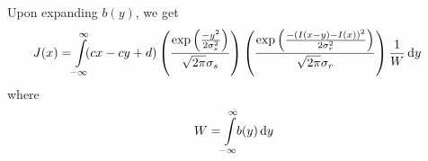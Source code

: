 \documentclass[a4paper]{article}
\begin{document}
\begin{enumerate}
Upon expanding $b(y)$, we get
\begin{align*}
J(x) &= \int\limits_{\mathclap{-\infty}}^{\mathclap{\infty}}\! (cx - cy + d) \left ( \dfrac{\exp\left (\frac{-y^2}{2\sigma_s^2}\right )}{\sqrt{2\pi}\sigma_s} \right ) \left ( \dfrac{\exp\left (\frac{-(I(x - y) - I(x))^2}{2\sigma_r^2}\right )}{\sqrt{2\pi}\sigma_r} \right )\dfrac{1}{W} \, \mathrm{d}y
\end{align*}
where
\begin{equation*}
W = \int\limits_{\mathclap{-\infty}}^{\mathclap{\infty}}\! b(y)\, \mathrm{d}y
\end{equation*}



\end{enumerate}
\end{document}

